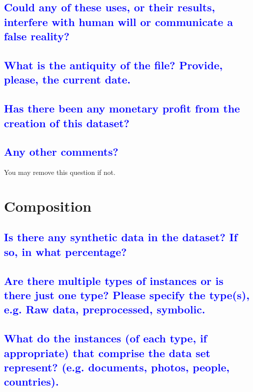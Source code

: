 \documentclass[letterpaper, 10 pt, conference]{ieeeconf}  %
\begin{document}
\textcolor{blue}{\subsection{Could any of these uses, or their results, interfere with human will or communicate a false reality?}}
\lipsum[1]

\textcolor{blue}{\subsection{What is the antiquity of the file? Provide, please, the current date.}}
\lipsum[1]

\textcolor{blue}{\subsection{Has there been any monetary profit from the creation of this dataset?}}
\lipsum[1]

\textcolor{blue}{\subsection{Any other comments? }}

You may remove this question if not.
\\



\section{Composition}

\textcolor{blue}{\subsection{Is there any synthetic data in the dataset? If so, in what percentage?}}
\lipsum[1]

\textcolor{blue}{\subsection{Are there multiple types of instances or is there just one type? Please specify the type(s), e.g. Raw data, preprocessed, symbolic.}}
\lipsum[1]

\textcolor{blue}{\subsection{What do the instances (of each  type, if appropriate) that comprise the data set represent? (e.g. documents, photos, people, countries).}}
\lipsum[1]
\end{document}
